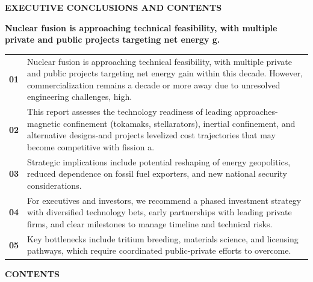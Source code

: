 \documentclass[10pt,a4paper]{article}
\begin{document}
{\textcolor{BOBlue}{\scriptsize\bfseries EXECUTIVE CONCLUSIONS AND CONTENTS}}\par\vspace{-1pt}
{\Large\sffamily\bfseries\color{BONavy} Nuclear fusion is approaching technical feasibility, with multiple private and public projects targeting net energy g.}\par\vspace{4pt}
\vspace{2pt}{\color{BOBright}\rule{\linewidth}{1pt}}\vspace{5pt}
\begin{tabularx}{\linewidth}{p{12mm}Y}
\textcolor{BOBlue}{\bfseries 01} & {\footnotesize Nuclear fusion is approaching technical feasibility, with multiple private and public projects targeting net energy gain within this decade. However, commercialization remains a decade or more away due to unresolved engineering challenges, high.} \\[4pt]
\textcolor{BOBlue}{\bfseries 02} & {\footnotesize This report assesses the technology readiness of leading approaches-magnetic confinement (tokamaks, stellarators), inertial confinement, and alternative designs-and projects levelized cost trajectories that may become competitive with fission a.} \\[4pt]
\textcolor{BOBlue}{\bfseries 03} & {\footnotesize Strategic implications include potential reshaping of energy geopolitics, reduced dependence on fossil fuel exporters, and new national security considerations.} \\[4pt]
\textcolor{BOBlue}{\bfseries 04} & {\footnotesize For executives and investors, we recommend a phased investment strategy with diversified technology bets, early partnerships with leading private firms, and clear milestones to manage timeline and technical risks.} \\[4pt]
\textcolor{BOBlue}{\bfseries 05} & {\footnotesize Key bottlenecks include tritium breeding, materials science, and licensing pathways, which require coordinated public-private efforts to overcome.} \\[4pt]
\end{tabularx}
\vspace{6pt}
{\textcolor{BOBlue}{\scriptsize\bfseries CONTENTS}}\par\vspace{2pt}
\end{document}

